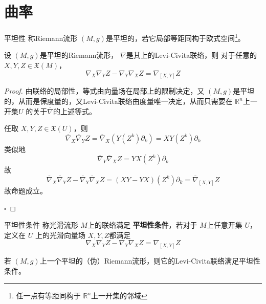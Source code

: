 \documentclass[../../几何与拓扑.tex]{subfiles}
\begin{document}
    
\ifSubfilesClassLoaded{
    \frontmatter

    \tableofcontents
    
    \mainmatter
}{}
\chapter{曲率}

\begin{definition}{平坦性}
    称Riemann流形 \(  \left( M,g \right)   \)是平坦的，若它局部等距同构于欧式空间\footnote{任一点有等距同构于 \(  \mathbb{R} ^{n}  \)上一开集的邻域 }。 
\end{definition}  

\begin{proposition}
    设 \(  \left( M,g \right)   \)是平坦的Riemann流形，  \(   \nabla   \)是其上的Levi-Civita联络，则 对于任意的 \(  X,Y,Z \in \mathfrak{X}\left( M \right)   \)，  \[
     \nabla _{X} \nabla _{Y}Z- \nabla _{Y} \nabla _{X}Z=   \nabla _{\left[ X,Y \right] }Z
    \]
\end{proposition}
\begin{proof}
    由联络的局部性，等式由向量场在局部上的限制决定，又 \(  \left( M,g \right)   \)是平坦的，从而是保度量的，又Levi-Civita联络由度量唯一决定，从而只需要在 \(  \mathbb{R} ^{n}  \)上一开集\(  U  \)  的关于\(  \overline{ \nabla }  \)的上述等式。
    
    任取 \(  X,Y,Z \in  \mathfrak{X}\left( U \right)  \)，则 \[
    \overline{ \nabla }_{X}  \overline{ \nabla } _{Y} Z= \overline{ \nabla }_{X}\left( Y\left( Z^{k} \right)\partial _{k}  \right) = XY\left( Z^{k} \right)\partial _{k} 
    \] 类似地 \[
    \overline{ \nabla }_{Y}  \overline{ \nabla }_{X}Z= YX\left( Z^{k} \right)\partial _{k} 
    \]故 \[
    \overline{ \nabla }_{X}  \overline{ \nabla }_{Y}Z - \overline{ \nabla }_{Y}  \overline{ \nabla }_{X} Z =  \left( XY-YX \right) \left( Z^{k} \right)\partial _{k}=  \overline{ \nabla }_{\left[ X,Y \right] }  Z
    \]故命题成立。

    \hfill $\square$
\end{proof}

\begin{definition}{平坦性条件}
    称光滑流形 \(  M  \)上的联络满足 \textbf{平坦性条件}，若对于 \(  M  \)上任意开集 \(  U  \)，定义在 \(  U  \)  上的光滑向量场 \(  X,Y,Z  \)都满足  \[
     \nabla _{X}  \nabla _{Y}Z -  \nabla _{Y}  \nabla _{X}Z =   \nabla _{\left[ X,Y \right] }Z
    \]  
\end{definition}

\begin{corollary}
    若 \(  \left( M,g \right)   \)上一个平坦的（伪）Riemann流形，则它的Levi-Civita联络满足平坦性条件。 
\end{corollary}
\end{document}
